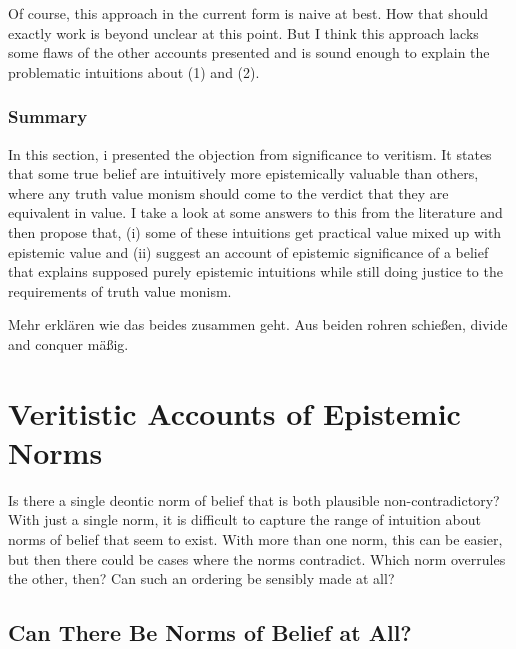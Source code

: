 \documentclass[12pt,numbers=noenddot]{scrartcl}
\begin{document}
Of course, this approach in the current form is naive at best. How that should exactly work is beyond unclear at this point. But I think this approach lacks some flaws of the other accounts presented and is sound enough to explain the problematic intuitions about (1) and (2).


\subsubsection{Summary}
In this section, i presented the objection from significance to veritism. It states that some true belief are intuitively more epistemically valuable than others, where any truth value monism should come to the verdict that they are equivalent in value. I take a look at some answers to this from the literature and then propose that, (i) some of these intuitions get practical value mixed up with epistemic value and (ii) suggest an account of epistemic significance of a belief that explains supposed purely epistemic intuitions while still doing justice to the requirements of truth value monism.


Mehr erklären wie das beides zusammen geht. Aus beiden rohren schießen, divide and conquer mäßig.

\clearpage
\section{Veritistic Accounts of Epistemic Norms}

Is there a single deontic norm of belief that is both plausible non-contradictory? With just a single norm, it is difficult to capture the range of intuition about norms of belief that seem to exist. With more than one norm, this can be easier, but then there could be cases where the norms contradict. Which norm overrules the other, then? Can such an ordering be sensibly made at all?

\subsection{Can There Be Norms of Belief at All?}


\end{document}
